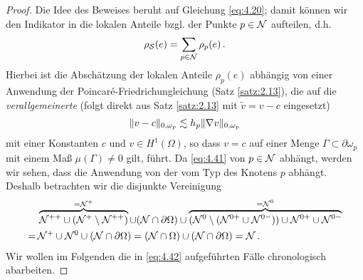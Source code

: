 \begin{proof}
Die Idee des Beweises beruht auf Gleichung \eqref{eq:4.20}; damit können wir den Indikator in die lokalen Anteile bzgl. der Punkte $p \in \mathcal N$ aufteilen, d.h.
\begin{align}\label{eq:4.40}
	\rho_{\mathcal S} (e) = \sum_{p \in \mathcal N} \rho_p (e) \, .
\end{align}
Hierbei ist die Abschätzung der lokalen Anteile $\rho_p(e)$ abhängig von einer Anwendung der Poincaré-Friedrichungleichung (Satz \ref{satz:2.13}), die auf die \textit{verallgemeinerte } (folgt direkt aus Satz \ref{satz:2.13} mit $\tilde v = v-c$ eingesetzt)
\begin{align}\label{eq:4.41}
	\lVert v-c\rVert_{0,\omega_p} \lesssim h_p \lVert \nabla v\rVert_{0,\omega_p}
\end{align}
mit einer Konstanten $c$ und $v\in H^1(\Omega)$, so dass $v=c$ auf einer Menge $\Gamma \subset \partial \omega_p$ mit einem Maß $\mu (\Gamma)\not= 0$ gilt, führt. Da \eqref{eq:4.41} von $p\in \mathcal N$ abhängt, werden wir sehen, dass die Anwendung von der  vom Typ des Knotens $p$ abhängt. Deshalb betrachten wir die disjunkte Vereinigung
\begin{align}\notag
	& \overbrace{\mathcal N^{++} \cup (\mathcal N^+ \setminus \mathcal N^{++})}^{=\mathcal N^+} \cup (\mathcal N \cap \partial \Omega ) \cup\overbrace{ (\mathcal N^0 \setminus (\mathcal N^{0+} \cup \mathcal N^{0-}))  \cup \mathcal N^{0+} \cup \mathcal N^{0-}}^{= \mathcal N^0} \\
	\label{eq:4.42}
	= \, & \mathcal N^+ \cup \mathcal N^0 \cup (\mathcal N \cap \partial \Omega)  = (\mathcal N \cap \Omega) \cup (\mathcal N \cap \partial \Omega) = \mathcal N \, .
\end{align}
Wir wollen im Folgenden die in \eqref{eq:4.42} aufgeführten Fälle chronologisch abarbeiten.


\end{proof}
